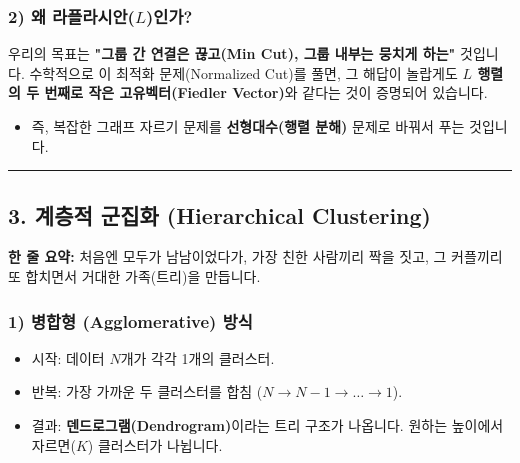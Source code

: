 \documentclass[11pt,a4paper]{book}
\theoremstyle{definition}
\begin{document}
\subsubsection*{2) 왜 라플라시안($L$)인가?}

우리의 목표는 \textbf{"그룹 간 연결은 끊고(Min Cut), 그룹 내부는 뭉치게 하는"} 것입니다.
수학적으로 이 최적화 문제(Normalized Cut)를 풀면, 그 해답이 놀랍게도 \textbf{$L$ 행렬의 두 번째로 작은 고유벡터(Fiedler Vector)}와 같다는 것이 증명되어 있습니다.
\begin{itemize}
    \item 즉, 복잡한 그래프 자르기 문제를 \textbf{선형대수(행렬 분해)} 문제로 바꿔서 푸는 것입니다.
\end{itemize}

\vspace{0.5cm}\hrule\vspace{0.5cm}

\subsection{3. 계층적 군집화 (Hierarchical Clustering)}


\begin{conceptbox}[title={개념 3: 족보 만들기 (Family Tree)}]
\textbf{한 줄 요약:} 처음엔 모두가 남남이었다가, 가장 친한 사람끼리 짝을 짓고, 그 커플끼리 또 합치면서 거대한 가족(트리)을 만듭니다.
\end{conceptbox}

\subsubsection*{1) 병합형 (Agglomerative) 방식}
\begin{itemize}
    \item 시작: 데이터 $N$개가 각각 1개의 클러스터.
    \item 반복: 가장 가까운 두 클러스터를 합침 ($N \to N-1 \to \dots \to 1$).
    \item 결과: \textbf{덴드로그램(Dendrogram)}이라는 트리 구조가 나옵니다. 원하는 높이에서 자르면($K$) 클러스터가 나뉩니다.
\end{itemize}
\end{document}
